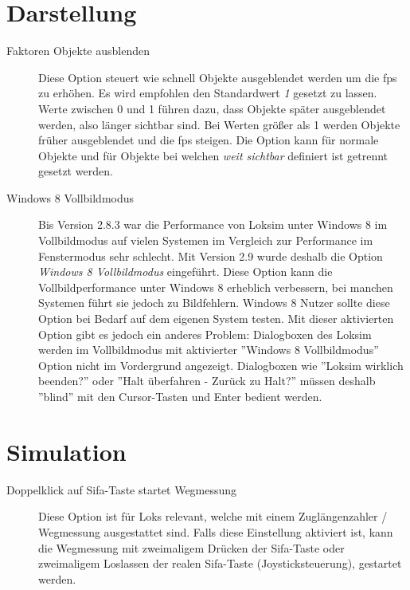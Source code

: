 \section{Darstellung}
\label{sec.sim.optionen.darstellung}
\begin{description}
\item[Faktoren Objekte ausblenden] Diese Option steuert wie schnell Objekte ausgeblendet werden um die fps zu erhöhen. Es wird empfohlen den Standardwert \emph{1} gesetzt zu lassen. Werte zwischen 0 und 1 führen dazu, dass Objekte später ausgeblendet werden, also länger sichtbar sind. Bei Werten größer als 1 werden Objekte früher ausgeblendet und die fps steigen. Die Option kann für normale Objekte und für Objekte bei welchen \emph{weit sichtbar} definiert ist getrennt gesetzt werden.
\item[Windows 8 Vollbildmodus] Bis Version 2.8.3 war die Performance von Loksim unter Windows 8 im Vollbildmodus auf vielen Systemen im Vergleich zur Performance im Fenstermodus sehr schlecht. Mit Version 2.9 wurde deshalb die Option \emph{Windows 8 Vollbildmodus} eingeführt. Diese Option kann die Vollbildperformance unter Windows 8 erheblich verbessern, bei manchen Systemen führt sie jedoch zu Bildfehlern. Windows 8 Nutzer sollte diese Option bei Bedarf auf dem eigenen System testen. Mit dieser aktivierten Option gibt es jedoch ein anderes Problem:
Dialogboxen des Loksim werden im Vollbildmodus mit aktivierter ''Windows 8 Vollbildmodus'' Option nicht im Vordergrund angezeigt.
Dialogboxen wie ''Loksim wirklich beenden?'' oder ''Halt überfahren - Zurück zu Halt?'' müssen deshalb ''blind'' mit den Cursor-Tasten und Enter bedient  werden.


\end{description}

\section{Simulation}
\label{sec.sim.optionen.simulation}
\begin{description}
\item[Doppelklick auf Sifa-Taste startet Wegmessung] Diese Option ist für Loks relevant, welche mit einem Zuglängenzahler / Wegmessung ausgestattet sind. Falls diese Einstellung aktiviert ist, kann die Wegmessung mit zweimaligem Drücken der Sifa-Taste oder zweimaligem Loslassen der realen Sifa-Taste (Joysticksteuerung), gestartet werden.
\end{description}
